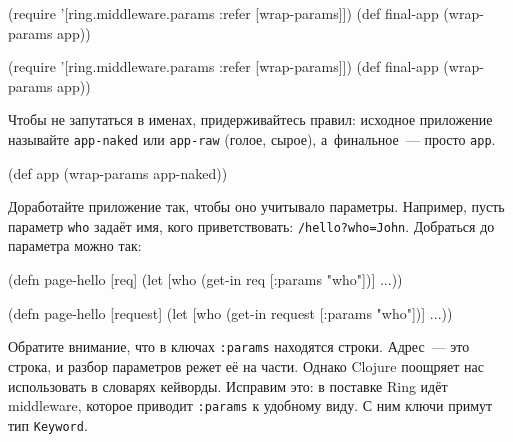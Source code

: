 \ifnarrow

\begin{english}
  \begin{clojure}
(require '[ring.middleware.params
           :refer [wrap-params]])
(def final-app (wrap-params app))
  \end{clojure}
\end{english}

\else

\begin{english}
  \begin{clojure}
(require '[ring.middleware.params :refer [wrap-params]])
(def final-app (wrap-params app))
  \end{clojure}
\end{english}

\fi

Чтобы не запутаться в именах, придерживайтесь правил: исходное приложение
называйте \verb|app-naked| или \verb|app-raw| (голое, сырое), а~финальное~---
просто \verb|app|.

\begin{english}
  \begin{clojure}
(def app (wrap-params app-naked))
  \end{clojure}
\end{english}

Доработайте приложение так, чтобы оно учитывало параметры. Например, пусть
параметр \verb|who| задаёт имя, кого приветствовать:
\texttt{/hello?\-who=\-John}. Добраться до параметра можно так:

\ifnarrow

\begin{english}
  \begin{clojure}
(defn page-hello [req]
  (let [who (get-in req [:params "who"])]
    ...))
  \end{clojure}
\end{english}

\else

\begin{english}
  \begin{clojure}
(defn page-hello [request]
  (let [who (get-in request [:params "who"])]
    ...))
  \end{clojure}
\end{english}

\fi


Обратите внимание, что в ключах \verb|:params| находятся строки. Адрес~--- это
строка, и разбор параметров режет её на части. Однако Clojure поощряет нас
использовать в словарях кейворды. Исправим это: в поставке Ring идёт middleware,
которое приводит \verb|:params| к удобному виду. С ним ключи примут тип
\verb|Keyword|.

